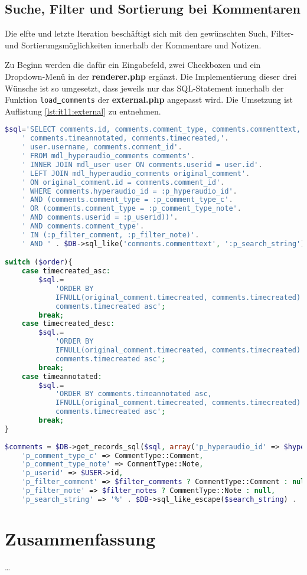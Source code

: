 \subsection{Suche, Filter und Sortierung bei Kommentaren}
Die elfte und letzte Iteration beschäftigt sich mit den gewünschten Such, Filter- und Sortierungsmöglichkeiten innerhalb der Kommentare und Notizen.

Zu Beginn werden die dafür ein Eingabefeld, zwei Checkboxen und ein Dropdown-Menü in der \textbf{renderer.php} ergänzt. Die Implementierung dieser drei Wünsche ist so umgesetzt, dass jeweils nur das SQL-Statement innerhalb der Funktion \texttt{load\underline{{ }}comments} der \textbf{external.php} angepasst wird. Die Umsetzung ist Auflistung \ref{lst:it11:external} zu entnehmen.

\begin{lstlisting}[language=php,
             linewidth=\textwidth,
             caption={Ausschnitt der \textbf{external.php} in der 11. Iteration},
             label={lst:it11:external}]
$sql='SELECT comments.id, comments.comment_type, comments.commenttext,'.
    ' comments.timeannotated, comments.timecreated,'.
    ' user.username, comments.comment_id'.
    ' FROM mdl_hyperaudio_comments comments'.
    ' INNER JOIN mdl_user user ON comments.userid = user.id'.
    ' LEFT JOIN mdl_hyperaudio_comments original_comment'.
    ' ON original_comment.id = comments.comment_id'.
    ' WHERE comments.hyperaudio_id = :p_hyperaudio_id'.
    ' AND (comments.comment_type = :p_comment_type_c'.
    ' OR (comments.comment_type = :p_comment_type_note'.
    ' AND comments.userid = :p_userid))'.
    ' AND comments.comment_type'.
    ' IN (:p_filter_comment, :p_filter_note)'.
    ' AND ' . $DB->sql_like('comments.commenttext', ':p_search_string');

switch ($order){
    case timecreated_asc:
        $sql.= 
            'ORDER BY
            IFNULL(original_comment.timecreated, comments.timecreated) asc,
            comments.timecreated asc';
        break;
    case timecreated_desc:
        $sql.= 
            'ORDER BY
            IFNULL(original_comment.timecreated, comments.timecreated) desc,
            comments.timecreated asc';
        break;
    case timeannotated:
        $sql.=
            'ORDER BY comments.timeannotated asc,
            IFNULL(original_comment.timecreated, comments.timecreated) asc,
            comments.timecreated asc';
        break;
}
        
$comments = $DB->get_records_sql($sql, array('p_hyperaudio_id' => $hyperaudio_id,
    'p_comment_type_c' => CommentType::Comment,
    'p_comment_type_note' => CommentType::Note,
    'p_userid' => $USER->id,
    'p_filter_comment' => $filter_comments ? CommentType::Comment : null,
    'p_filter_note' => $filter_notes ? CommentType::Note : null,
    'p_search_string' => '%' . $DB->sql_like_escape($search_string) . '%'));
\end{lstlisting}





\section{Zusammenfassung}
\dots